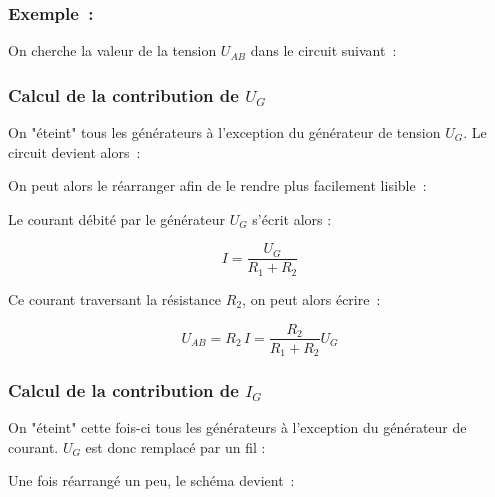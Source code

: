 \pagebreak
\subsubsection*{Exemple~:}

On cherche la valeur de la tension $U_{AB}$ dans le circuit suivant~:

\begin{center}
	
\end{center}


\subsubsection*{Calcul de la contribution de $U_G$}


On "éteint" tous les générateurs à l'exception du générateur de tension $U_G$. Le circuit devient alors~:

\begin{center}
	
\end{center}

On peut alors le réarranger afin de le rendre plus facilement lisible~:

\begin{center}
	
\end{center}

Le courant débité par le générateur $U_G$ s'écrit alors :

$$ I = \dfrac{U_G}{R_1 + R_2} $$

Ce courant traversant la résistance $R_2$, on peut alors écrire~:

$$ U_{AB} = R_2 \, I = \dfrac{R_2}{R_1 + R_2} U_G $$

\subsubsection*{Calcul de la contribution de $I_G$}

On "éteint" cette fois-ci tous les générateurs à l'exception du générateur de courant. $U_G$ est donc remplacé par un fil :

\begin{center}
	
\end{center}

Une fois réarrangé un peu, le schéma devient~:

\begin{center}
	
\end{center}


